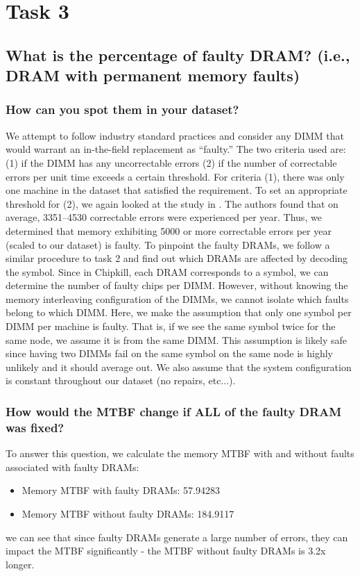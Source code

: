 \section{Task 3}
\subsection{What is the percentage of faulty DRAM?  (i.e., DRAM with permanent
memory faults) }

\subsubsection{How can you spot them in your dataset?}
We attempt to follow industry standard practices and consider any DIMM that
would warrant an in-the-field replacement as ``faulty.''  The two criteria used
are: (1) if the DIMM has any uncorrectable errors (2) if the number of
correctable errors per unit time exceeds a certain threshold.  For criteria (1),
there was only one machine in the dataset that satisfied the requirement.  To
set an appropriate threshold for (2), we again looked at the study in
\cite{schroeder2009dram}.  The authors found that on average, 3351--4530
correctable errors were experienced per year.  Thus, we determined that memory
exhibiting 5000 or more correctable errors per year (scaled to our dataset) is
faulty.  To pinpoint the faulty DRAMs, we follow a similar procedure to task 2
and find out which DRAMs are affected by decoding the symbol.  Since in
Chipkill, each DRAM corresponds to a symbol, we can determine the number of
faulty chips per DIMM.  However, without knowing the memory interleaving
configuration of the DIMMs, we cannot isolate which faults belong to which DIMM.
Here, we make the assumption that only one symbol per DIMM per machine is
faulty.  That is, if we see the same symbol twice for the same node, we assume
it is from the same DIMM. This assumption is likely safe since having two DIMMs
fail on the same symbol on the same node is highly unlikely and it should
average out. We also assume that the system configuration is constant throughout
our dataset (no repairs, etc...).

\subsubsection{How would the MTBF change if ALL of the faulty DRAM was fixed?}
To answer this question, we calculate the memory MTBF with and without faults
associated with faulty DRAMs:
\begin{itemize}
  \item Memory MTBF with faulty DRAMs: 57.94283
  \item Memory MTBF without faulty DRAMs: 184.9117
\end{itemize}
we can see that since faulty DRAMs generate a large number of errors, they can
impact the MTBF significantly - the MTBF without faulty DRAMs is 3.2x longer.

